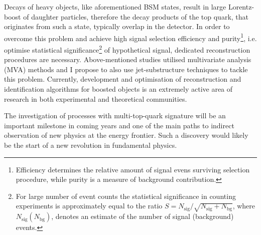 \textcolor{\mycolor}{
Decays of heavy objects, like  aforementioned BSM states, result in large Lorentz-boost of daughter particles, therefore the decay products of the top quark, that originates from such a state, typically overlap in the detector. In order to overcome this problem and achieve high signal selection efficiency and purity\footnote{Efficiency determines the relative amount of signal evens surviving selection procedure, while purity is a measure of background contribution.}, i.e. optimise statistical significance\footnote{For large number of event counts the statistical significance in counting experiments is approximately equal to the ratio $S=N_{\mathrm{sig}}/\sqrt{N_{\mathrm{sig}}+N_{\mathrm{bg}}}$, where $N_{\mathrm{sig}}\left(N_{\mathrm{bg}}\right)$, denotes an estimate of the number of signal (background) events.} of hypothetical signal, dedicated reconstruction procedures are necessary. Above-mentioned studies utilised multivariate analysis (MVA) methods and I propose to also use jet-substructure techniques to tackle this problem. Currently, development and optimisation of reconstruction and identification algorithms for boosted objects is an extremely active area of research in both experimental and theoretical communities.}

\textcolor{\mycolor}{
The investigation of processes with multi-top-quark signature will be an important milestone in coming years and one of the main paths to indirect observation of new physics at the energy frontier. Such a discovery would likely be the start of a new revolution in fundamental physics. }
